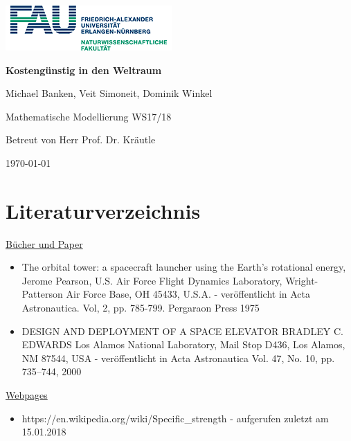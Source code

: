 \documentclass[a4paper, 10pt]{report}
\begin{document}
\begin{titlepage}
\centering
\includegraphics[scale=1]{FAU-nat-logo.png}\par
\vspace{2cm}
{\huge\bfseries Kostengünstig in den Weltraum\par}
\vspace{1cm}
{\Large Michael Banken, Veit Simoneit, Dominik Winkel\par}
\vspace{2cm}
{\Large Mathematische Modellierung WS17/18\par}
\vspace{0.5cm}
{Betreut von Herr Prof. Dr. Kräutle\par}
\vfill
{\Large \today\par}

\end{titlepage}

\tableofcontents
\chapter*{Literaturverzeichnis}
{\Large \uline{Bücher und Paper}\par}

\begin{itemize}
\item The orbital tower: a spacecraft launcher using the Earth's rotational energy, Jerome Pearson, U.S. Air Force Flight Dynamics Laboratory, Wright-Patterson Air Force Base, OH 45433, U.S.A. - veröffentlicht in Acta Astronautica. Vol, 2, pp. 785-799. Pergaraon Press 1975

\item DESIGN AND DEPLOYMENT OF A SPACE ELEVATOR
BRADLEY C. EDWARDS Los Alamos National Laboratory, Mail Stop D436, Los Alamos, NM 87544, USA - veröffentlicht in Acta Astronautica Vol. 47, No. 10, pp. 735–744, 2000

\end{itemize}

{\Large \uline{Webpages}\par}
\begin{itemize}
\item https://en.wikipedia.org/wiki/Specific\_strength - aufgerufen zuletzt am 15.01.2018 

\end{itemize}
\end{document}
